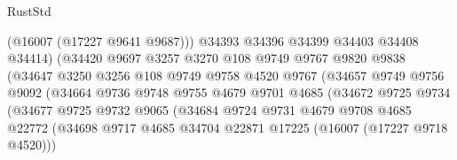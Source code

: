 \begin{lexlean}{RustStd}
\begin{coremodule}
                                    (@16007 (@17227 @9641 @9687)))
                                  @34393
                                  @34396
                                  @34399
                                  @34403
                                  @34408
                                  @34414)
                                (@34420
                                  @9697
                                  @3257
                                  @3270
                                  @108
                                  @9749
                                  @9767
                                  @9820
                                  @9838
                                  (@34647
                                    @3250
                                    @3256
                                    @108
                                    @9749
                                    @9758
                                    @4520
                                    @9767
                                    (@34657
                                      @9749
                                      @9756
                                      @9092
                                      (@34664
                                        @9736
                                        @9748
                                        @9755
                                        @4679
                                        @9701
                                        @4685
                                        (@34672
                                          @9725
                                          @9734
                                          (@34677
                                            @9725
                                            @9732
                                            @9065
                                            (@34684
                                              @9724
                                              @9731
                                              @4679
                                              @9708
                                              @4685
                                              @22772
                                              (@34698
                                                @9717
                                                @4685
                                                @34704
                                                @22871
                                                @17225
                                                (@16007 (@17227 @9718 @4520)))

\end{coremodule}
\end{lexlean}
